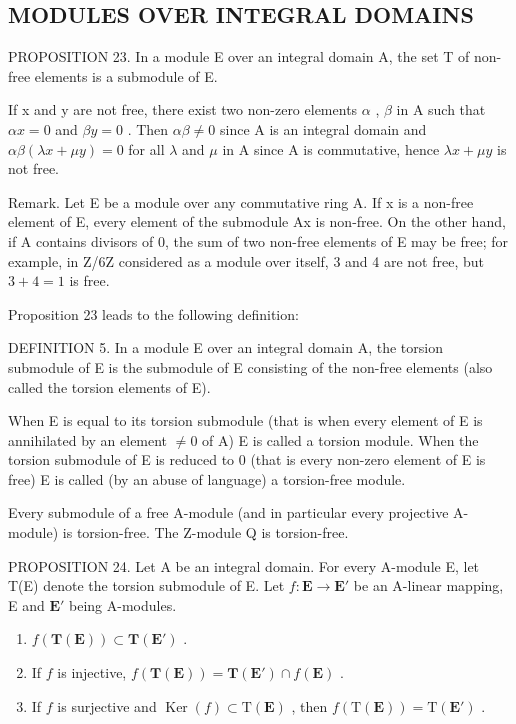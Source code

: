 \subsection{MODULES OVER INTEGRAL DOMAINS}

PROPOSITION 23. In a module E over an integral domain A, the set T of non-free elements is a submodule of E.

If x and y are not free, there exist two non-zero elements \(\alpha\) , \(\beta\) in A such that \(\alpha x = 0\) and \(\beta y = 0\) . Then \(\alpha\beta \neq 0\) since A is an integral domain and \(\alpha\beta(\lambda x + \mu y) = 0\) for all \(\lambda\) and \(\mu\) in A since A is commutative, hence \(\lambda x + \mu y\) is not free.

Remark. Let E be a module over any commutative ring A. If x is a non-free element of E, every element of the submodule Ax is non-free. On the other hand, if A contains divisors of 0, the sum of two non-free elements of E may be free; for example, in Z/6Z considered as a module over itself, 3 and 4 are not free, but \(3 + 4 = 1\) is free.

Proposition 23 leads to the following definition:

DEFINITION 5. In a module E over an integral domain A, the torsion submodule of E is the submodule of E consisting of the non-free elements (also called the torsion elements of E).

When E is equal to its torsion submodule (that is when every element of E is annihilated by an element \(\neq0\) of A) E is called a torsion module. When the torsion submodule of E is reduced to 0 (that is every non-zero element of E is free) E is called (by an abuse of language) a torsion-free module.

Every submodule of a free A-module (and in particular every projective A-module) is torsion-free. The Z-module Q is torsion-free.

PROPOSITION 24. Let A be an integral domain. For every A-module E, let T(E) denote the torsion submodule of E. Let \(f: \mathbf{E} \to \mathbf{E}'\) be an A-linear mapping, E and \(\mathbf{E}'\) being A-modules.

\begin{enumerate}
\def\labelenumi{(\roman{enumi})}
\item
  \(f(\mathbf{T}(\mathbf{E})) \subset \mathbf{T}(\mathbf{E}')\) .
\item
  If \(f\) is injective, \(f(\mathbf{T}(\mathbf{E})) = \mathbf{T}(\mathbf{E}') \cap f(\mathbf{E})\) .
\item
  If \(f\) is surjective and \(\operatorname{Ker}(f) \subset \mathrm{T}(\mathbf{E})\) , then \(f(\mathrm{T}(\mathbf{E})) = \mathrm{T}(\mathbf{E}')\) .
\end{enumerate}

